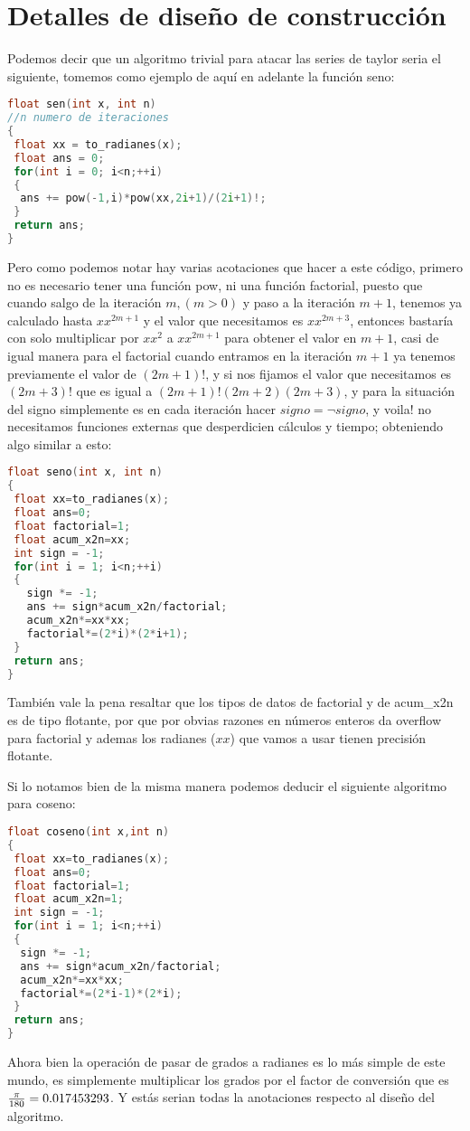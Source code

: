 \section{Detalles de diseño de construcción}

Podemos decir que un algoritmo trivial para atacar las series de taylor seria el siguiente, tomemos como ejemplo de aquí en adelante la función seno:
\begin{lstlisting}[language=C++]
float sen(int x, int n)
//n numero de iteraciones 
{
 float xx = to_radianes(x);
 float ans = 0;
 for(int i = 0; i<n;++i)
 {
  ans += pow(-1,i)*pow(xx,2i+1)/(2i+1)!;
 }
 return ans;
}
\end{lstlisting}

Pero como podemos notar hay varias acotaciones que hacer a este código, primero no es necesario tener una función pow, ni una función factorial, puesto que cuando salgo de la iteración $m,(m>0)$ y paso a la iteración $m+1$, tenemos ya calculado hasta $xx^{2m+1}$ y el valor que necesitamos es $xx^{2m+3}$, entonces bastaría con solo multiplicar por $xx^{2}$  a $xx^{2m+1}$ para obtener el valor en $m+1$, casi de igual manera para el factorial cuando entramos en la iteración $m+1$ ya tenemos previamente el valor de $(2m+1)!$, y si nos fijamos el valor que necesitamos es $(2m+3)!$ que es igual a $(2m+1)!(2m+2)(2m+3)$, y para la situación del signo simplemente es en cada iteración hacer $signo = \neg signo$, y voila! no necesitamos funciones externas que desperdicien cálculos y tiempo; obteniendo algo similar a esto:

\begin{lstlisting}[language=C++]
float seno(int x, int n)
{
 float xx=to_radianes(x);
 float ans=0;
 float factorial=1;
 float acum_x2n=xx;
 int sign = -1;
 for(int i = 1; i<n;++i)
 {
   sign *= -1;
   ans += sign*acum_x2n/factorial;
   acum_x2n*=xx*xx;
   factorial*=(2*i)*(2*i+1);
 }
 return ans;
}

\end{lstlisting}
También vale la pena resaltar que los tipos de datos de factorial y de acum\_x2n es de tipo flotante, por que por obvias razones en números enteros da overflow para factorial y ademas los radianes ($xx$) que vamos a usar tienen precisión flotante.

Si lo notamos bien de la misma manera podemos deducir el siguiente algoritmo para coseno:
\begin{lstlisting}[language=C++]
float coseno(int x,int n)
{
 float xx=to_radianes(x);
 float ans=0;
 float factorial=1;
 float acum_x2n=1;
 int sign = -1;
 for(int i = 1; i<n;++i)
 {
  sign *= -1;
  ans += sign*acum_x2n/factorial;
  acum_x2n*=xx*xx;
  factorial*=(2*i-1)*(2*i);
 }
 return ans;
}

\end{lstlisting}

Ahora bien la operación de pasar de grados a radianes es lo más simple de este mundo, es simplemente multiplicar los grados por el factor de conversión que es ${{\pi}\over{180}} = 0.017453293$. Y estás serian todas la anotaciones respecto al diseño del algoritmo.




